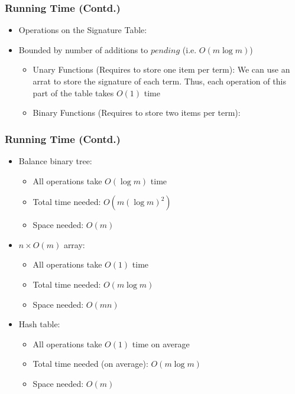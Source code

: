 \documentclass{beamer}
\begin{document}
\begin{frame}
  \frametitle{Running Time (Contd.)}
  \begin{itemize}
  \item Operations on the Signature Table:
  \item Bounded by number of additions to $pending$ (i.e. $O(m \log m)$)
    \begin{itemize}
    \item Unary Functions (Requires to store one item per term): We can use an arrat to store the signature of each term. Thus, each operation of this part of the table takes $O(1)$ time
    \item Binary Functions (Requires to store two items per term):  
    \end{itemize}
  \end{itemize}
\end{frame}

\begin{frame}
  \frametitle{Running Time (Contd.)}
  \begin{itemize}
  \item Balance binary tree:
    \begin{itemize}
    \item All operations take $O(\log m)$ time
    \item Total time needed: $O(m (\log m)^2)$
    \item Space needed: $O(m)$
    \end{itemize}
  \item $n \times O(m)$ array:
    \begin{itemize}
    \item All operations take $O(1)$ time
    \item Total time needed: $O(m \log m)$
    \item Space needed: $O(m n)$
    \end{itemize}
  \item Hash table:
    \begin{itemize}
    \item All operations take $O(1)$ time on average
    \item Total time needed (on average): $O(m \log m)$
    \item Space needed: $O(m)$
    \end{itemize}
  \end{itemize}
\end{frame}
\end{document}
